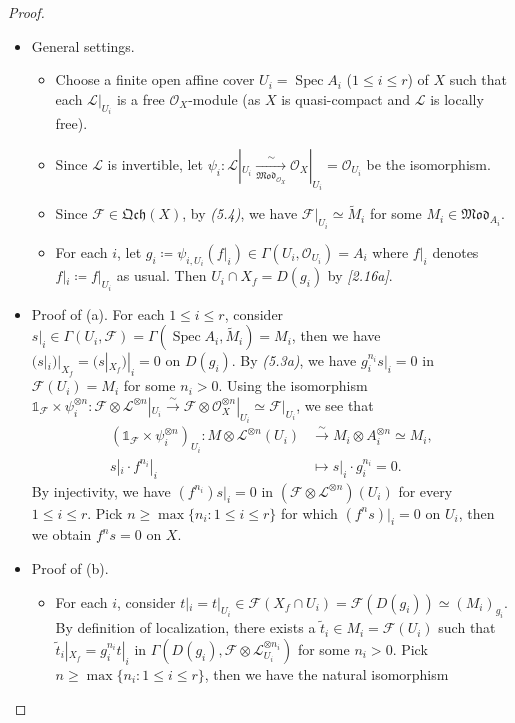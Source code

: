 \documentclass[11pt,a4paper,footinclude=true,headinclude=true]{scrbook} %
\DeclareMathOperator{\Spec}{Spec}
\newcommand{\FF}{\mathscr{F}}
\newcommand{\LL}{\mathscr{L}}
\newcommand{\OO}{\mathcal{O}}
\newcommand{\<}{\langle}
\newcommand{\>}{\rangle}
\newcommand{\isoto}{\overset{\sim}{\to}}
\newcommand{\isolongto}{\overset{\sim}{\longrightarrow}}
\newcommand{\MOD}{\mathfrak{Mod}}
\newcommand{\qcoh}{\mathfrak{Qch}}
\begin{document}
\begin{proof}\mbox{}
    \begin{itemize}
        \item General settings.
        \begin{itemize}
            \item Choose a finite open affine cover $U_i=\Spec A_i$ ($1\leq i\leq r$) of $X$ such that each $\LL|_{U_i}$ is a free $\OO_X$-module (as $X$ is quasi-compact and $\LL$ is locally free).
            \item Since $\LL$ is invertible, let $\psi_i:\LL|_{U_i}\xrightarrow[\MOD_{\OO_X}]{\sim}\OO_X|_{U_i}=\OO_{U_i}$ be the isomorphism.
            \item Since $\FF\in\qcoh(X)$, by \textit{(5.4)}, we have $\FF|_{U_i}\simeq\widetilde{M}_i$ for some $M_i\in \MOD_{A_i}$.
            \item For each $i$, let $g_i\coloneqq\psi_{i,U_i}(f|_i)\in\Gamma(U_i,\OO_{U_i})=A_i$ where $f|_i$ denotes $f|_i\coloneqq f|_{U_i}$ as usual. Then $U_i\cap X_f=D(g_i)$ by \textit{[2.16a]}.
        \end{itemize}
        \item Proof of (a). For each $1\leq i\leq r$, consider $s|_i\in\Gamma(U_i,\FF)=\Gamma(\Spec A_i,\widetilde{M}_i)=M_i$, then we have $(s|_i)|_{X_f}=(s|_{X_f})|_i=0$ on $D(g_i)$. By \textit{(5.3a)}, we have $g_i^{n_i}s|_i=0$ in $\FF(U_i)=M_i$ for some $n_i>0$. Using the isomorphism $\mathds{1}_\FF\times\psi_i^{\otimes n}:\FF\otimes\LL^{\otimes n}|_{U_i}\isoto\FF\otimes\OO_X^{\otimes n}|_{U_i}\simeq\FF|_{U_i}$, we see that
            \begin{align*}
                (\mathds{1}_\FF\times\psi_i^{\otimes n})_{U_i}:M\otimes\LL^{\otimes n}(U_i) &\isolongto M_i\otimes A_i^{\otimes n}\simeq M_i,\\
                s|_i\cdot f^{n_i}|_i &\longmapsto s|_i\cdot g_i^{n_i}=0.
            \end{align*}
            By injectivity, we have $(f^{n_i})s|_i=0$ in $(\FF\otimes\LL^{\otimes n})(U_i)$ for every $1\leq i \leq r$. Pick $n\geq\max\{n_i:1\leq i\leq r\}$ for which $(f^ns)|_i=0$ on $U_i$, then we obtain $f^ns=0$ on $X$.
        \item Proof of (b).
        \begin{itemize}
            \item For each $i$, consider $t|_i=t|_{U_i}\in\FF(X_f\cap U_i)=\FF(D(g_i))\simeq(M_i)_{g_i}$. By definition of localization, there exists a $\tilde{t}_i\in M_i=\FF(U_i)$ such that $\tilde{t}_i|_{X_f}=g_i^{n_i}t|_i$ in $\Gamma(D(g_i),\FF\otimes\LL_{U_i}^{\otimes n_i})$ for some $n_i>0$. Pick $n\geq\max\{n_i:1\leq i\leq r\}$, then we have the natural isomorphism

\end{itemize}
\end{itemize}
\end{proof}
\end{document}

